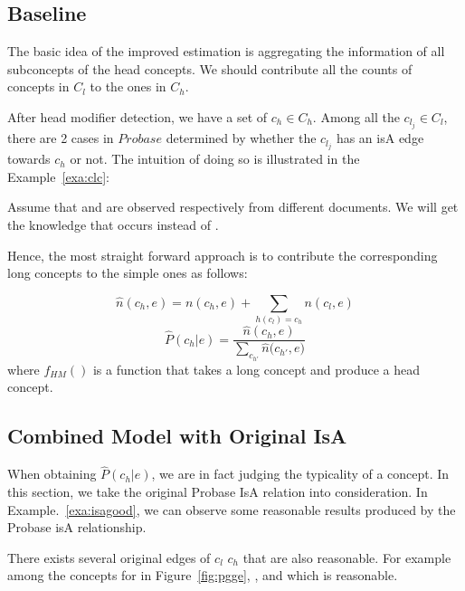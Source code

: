 \subsection{Baseline}

The basic idea of the improved estimation is aggregating the information of all subconcepts of the head concepts.
We should contribute all the counts of concepts in $C_{l}$ to the ones in $C_{h}$.

After head modifier detection, we have a set of ${c_h} \in C_{h}$.
Among all the $c_{l_j}\in C_{l}$, there are 2 cases in $Probase$ determined by whether the $c_{l_j}$ has an isA edge towards ${c_h}$ or not.
The intuition of doing so is illustrated in the Example~\ref{exa:clc}:
\begin{example}
\label{exa:clc}
Assume that   and  are observed respectively  from different documents.
We will get the knowledge that  occurs  instead of .
\end{example}
Hence, the most straight forward approach is to contribute the corresponding long concepts to the simple ones as follows:

$$\hat{n}(c_h, e)={n}(c_h, e)+\sum_{ h(c_l)=c_h} n(c_l,e)$$
$$\hat{P}(c_h|e)=\frac{\hat{n}(c_h, e)}{\sum_{c_{h'}}{\hat{n}(c_{h'}}, e)}$$
where $f_{HM}()$ is a function that takes a long concept and produce a head concept.


\subsection{Combined Model with Original IsA}
When obtaining $\hat{P}(c_h|e)$, we are in fact judging the typicality of a concept.
In this section, we take the original Probase IsA relation into consideration. In Example.~\ref{exa:isagood}, we can observe some reasonable results produced by the Probase isA relationship.

\begin{example}
\label{exa:isagood}
There exists several original edges of $c_l$ \isa $c_h$ that are also reasonable. 
For example among the concepts for  in Figure~\ref{fig:pgge},  \isa {}, and  \isa {} which is reasonable.
\end{example}

